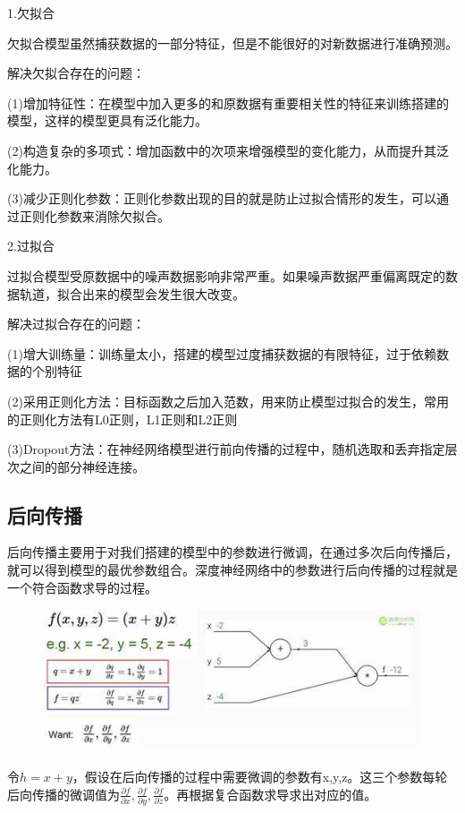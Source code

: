\documentclass[openbib]{article}
\begin{document}
\begin{center}
	1.欠拟合
\end{center}

欠拟合模型虽然捕获数据的一部分特征，但是不能很好的对新数据进行准确预测。

解决欠拟合存在的问题：

(1)增加特征性：在模型中加入更多的和原数据有重要相关性的特征来训练搭建的模型，这样的模型更具有泛化能力。

(2)构造复杂的多项式：增加函数中的次项来增强模型的变化能力，从而提升其泛化能力。

(3)减少正则化参数：正则化参数出现的目的就是防止过拟合情形的发生，可以通过正则化参数来消除欠拟合。

\begin{center}
	2.过拟合
\end{center}

过拟合模型受原数据中的噪声数据影响非常严重。如果噪声数据严重偏离既定的数据轨道，拟合出来的模型会发生很大改变。

解决过拟合存在的问题：

(1)增大训练量：训练量太小，搭建的模型过度捕获数据的有限特征，过于依赖数据的个别特征

(2)采用正则化方法：目标函数之后加入范数，用来防止模型过拟合的发生，常用的正则化方法有L0正则，L1正则和L2正则

(3)Dropout方法：在神经网络模型进行前向传播的过程中，随机选取和丢弃指定层次之间的部分神经连接。

\subsection{后向传播}
后向传播主要用于对我们搭建的模型中的参数进行微调，在通过多次后向传播后，就可以得到模型的最优参数组合。深度神经网络中的参数进行后向传播的过程就是一个符合函数求导的过程。

\begin{figure}[htbp]
	\centering
	\includegraphics[scale=0.4]{3-7}
\end{figure}
令$h=x+y$，假设在后向传播的过程中需要微调的参数有x,y,z。这三个参数每轮后向传播的微调值为$\frac{\partial f}{\partial x},\frac{\partial f}{\partial y},\frac{\partial f}{\partial z}$。再根据复合函数求导求出对应的值。
\end{document}
